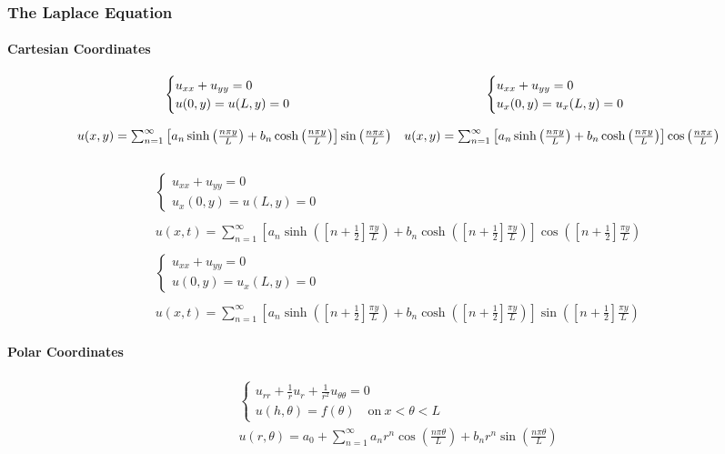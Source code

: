 \documentclass{article}
\begin{document}
\subsubsection{The Laplace Equation}
\paragraph{Cartesian Coordinates}
\[
\begin{array}{c c}
\begin{cases}
u_{xx} + u_{yy} = 0\\
u(0,y) = u(L,y) = 0
\end{cases}
&
\begin{cases}
u_{xx} + u_{yy} = 0\\
u_{x}(0,y) = u_{x}(L,y) = 0
\end{cases}\\
&\\
u(x,y) = \sum_{n=1}^{\infty}\left[a_{n}\sinh{\left(\frac{n \pi y}{L}\right)} + b_{n}\cosh{\left(\frac{n\pi y}{L}\right)}\right]\sin{\left(\frac{n\pi x}{L}\right)}
& u(x,y) = \sum_{n=1}^{\infty}\left[a_{n}\sinh{\left(\frac{n \pi y}{L}\right)} + b_{n}\cosh{\left(\frac{n\pi y}{L}\right)}\right]\cos{\left(\frac{n\pi x}{L}\right)}
\end{array}
\]
\\
\[
\begin{array}{c}
\begin{cases}
u_{xx} + u_{yy} = 0\\
u_{x}(0,y) = u(L,y) = 0
\end{cases}\\
\\
u(x,t) = \sum_{n=1}^{\infty}\left[a_{n}\sinh{\left(\left[n + \frac{1}{2}\right]\frac{\pi y}{L}\right)} + b_{n}\cosh{\left(\left[n + \frac{1}{2}\right]\frac{\pi y}{L}\right)}\right]\cos{\left(\left[n + \frac{1}{2}\right]\frac{\pi y}{L}\right)}\\
\\
\begin{cases}
u_{xx} + u_{yy} = 0\\
u(0,y) = u_{x}(L,y) = 0
\end{cases}\\
\\
u(x,t) = \sum_{n=1}^{\infty}\left[a_{n}\sinh{\left(\left[n + \frac{1}{2}\right]\frac{\pi y}{L}\right)} + b_{n}\cosh{\left(\left[n + \frac{1}{2}\right]\frac{\pi y}{L}\right)}\right]\sin{\left(\left[n + \frac{1}{2}\right]\frac{\pi y}{L}\right)}
\end{array}
\]
\paragraph{Polar Coordinates}
\begin{gather*}
\begin{cases}
u_{rr} + \frac{1}{r}u_{r} + \frac{1}{r^{2}}u_{\theta\theta} = 0\\
u(h,\theta) = f(\theta)\quad \text{on}\ x < \theta < L
\end{cases}\\
u(r,\theta) = a_{0} + \sum_{n=1}^{\infty}a_{n}r^{n}\cos{\left(\frac{n \pi \theta}{L}\right)} + b_{n}r^{n}\sin{\left(\frac{n \pi \theta}{L}\right)}
\end{gather*}
\newpage
\end{document}
